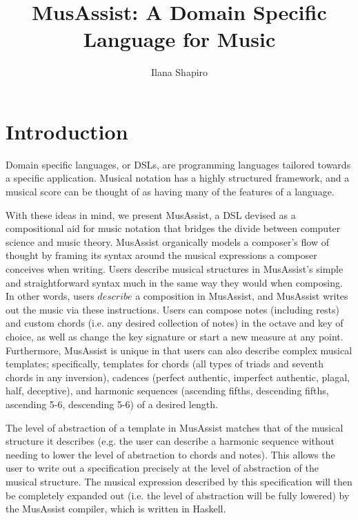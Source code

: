 \documentclass{report}
\title{MusAssist: A Domain Specific Language for Music }
\author{Ilana Shapiro}
\begin{document}
\maketitle

\tableofcontents

\chapter{Introduction}

Domain specific languages, or DSLs, are programming languages tailored towards a specific application. Musical notation has a highly structured framework, and a musical score can be thought of as having many of the features of a language. 

With these ideas in mind, we present MusAssist, a DSL devised as a compositional aid for music notation that bridges the divide between computer science and music theory. MusAssist organically models a composer's flow of thought by framing its syntax around the musical expressions a composer conceives when writing. Users describe musical structures in MusAssist's simple and straightforward syntax much in the same way they would when composing. In other words, users $describe$ a composition in MusAssist, and MusAssist writes out the music via these instructions. Users can compose notes (including rests) and custom chords (i.e. any desired collection of notes) in the octave and key of choice, as well as change the key signature or start a new measure at any point. Furthermore, MusAssist is unique in that users can also describe complex musical templates; specifically, templates for chords (all types of triads and seventh chords in any inversion), cadences (perfect authentic, imperfect authentic, plagal, half, deceptive), and harmonic sequences (ascending fifths, descending fifths, ascending 5-6, descending 5-6) of a desired length. 

The level of abstraction of a template in MusAssist matches that of the musical structure it describes (e.g. the user can describe a harmonic sequence without needing to lower the level of abstraction to chords and notes). This allows the user to write out a specification precisely at the level of abstraction of the musical structure. The musical expression described by this specification will then be completely expanded out (i.e. the level of abstraction will be fully lowered) by the MusAssist compiler, which is written in Haskell.
\end{document}
